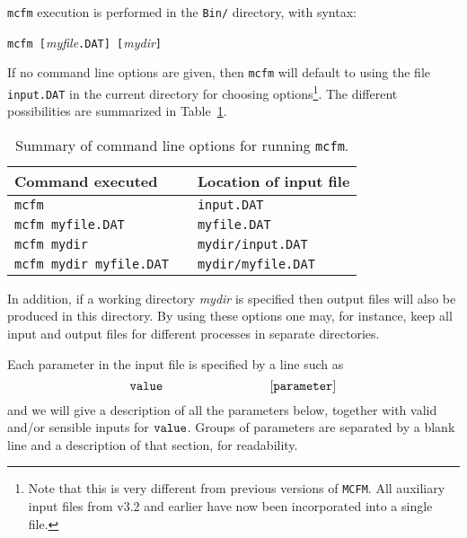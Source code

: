 \documentclass[12pt]{article}
\begin{document}
{\tt mcfm} execution is performed in the {\tt Bin/} directory,
with syntax:
\begin{center}
{\tt mcfm [}{\it myfile}{\tt .DAT] [}{\it mydir}{\tt ]}
\end{center}
If no command line options are given, then {\tt mcfm} will default
to using the file {\tt input.DAT} in the current directory for
choosing options\footnote{Note that this is very different from
previous versions of {\tt MCFM}. All auxiliary input files from v3.2 and
earlier have now been incorporated into a single file.}.
The different possibilities are summarized in Table~\ref{clopts}.
\begin{table}
\begin{center}
\begin{tabular}{l|cl}
Command executed && Location of input file \\
\hline
{\tt mcfm}                      && {\tt input.DAT} \\
{\tt mcfm myfile.DAT}           && {\tt myfile.DAT} \\
{\tt mcfm mydir}                && {\tt mydir/input.DAT} \\
{\tt mcfm mydir myfile.DAT}     && {\tt mydir/myfile.DAT} \\
\end{tabular}
\end{center}
\caption{Summary of command line options for running {\tt mcfm}.}
\label{clopts}
\end{table}
In addition, if a working directory {\it mydir} is specified then
output files will also be produced in this directory. By using these
options one may, for instance, keep all input and output files for
different processes in separate directories.

Each parameter in the input file is specified by a line such as
\begin{displaymath}
{\tt value} \hspace{3cm} {\tt [parameter]}
\end{displaymath}
and we will give a description of all the parameters below, together with
valid and/or sensible inputs for ${\tt value}$. Groups of parameters
are separated by a blank line and a description of that section, for
readability.
\end{document}
